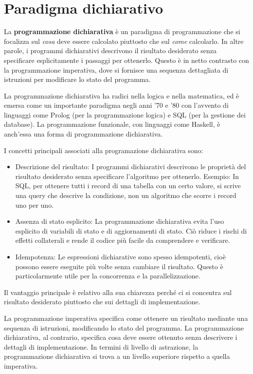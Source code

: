 \documentclass[
  letterpaper,
  DIV=11,
  numbers=noendperiod]{scrreprt}
\providecommand{\tightlist}{%
  \setlength{\itemsep}{0pt}\setlength{\parskip}{0pt}}\usepackage{longtable,booktabs,array}
\begin{document}
\section{Paradigma dichiarativo}\label{paradigma-dichiarativo}

La \textbf{programmazione dichiarativa} è un paradigma di programmazione
che si focalizza sul \emph{cosa} deve essere calcolato piuttosto che sul
\emph{come} calcolarlo. In altre parole, i programmi dichiarativi
descrivono il risultato desiderato senza specificare esplicitamente i
passaggi per ottenerlo. Questo è in netto contrasto con la
programmazione imperativa, dove si fornisce una sequenza dettagliata di
istruzioni per modificare lo stato del programma.

La programmazione dichiarativa ha radici nella logica e nella
matematica, ed è emersa come un importante paradigma negli anni '70 e
'80 con l'avvento di linguaggi come Prolog (per la programmazione
logica) e SQL (per la gestione dei database). La programmazione
funzionale, con linguaggi come Haskell, è anch'essa una forma di
programmazione dichiarativa.

I concetti principali associati alla programazione dichiarativa sono:

\begin{itemize}
\tightlist
\item
  Descrizione del risultato: I programmi dichiarativi descrivono le
  proprietà del risultato desiderato senza specificare l'algoritmo per
  ottenerlo. Esempio: In SQL, per ottenere tutti i record di una tabella
  con un certo valore, si scrive una query che descrive la condizione,
  non un algoritmo che scorre i record uno per uno.
\item
  Assenza di stato esplicito: La programmazione dichiarativa evita l'uso
  esplicito di variabili di stato e di aggiornamenti di stato. Ciò
  riduce i rischi di effetti collaterali e rende il codice più facile da
  comprendere e verificare.
\item
  Idempotenza: Le espressioni dichiarative sono spesso idempotenti, cioè
  possono essere eseguite più volte senza cambiare il risultato. Questo
  è particolarmente utile per la concorrenza e la parallelizzazione.
\end{itemize}

Il vantaggio principale è relativo alla sua chiarezza perché ci si
concentra sul risultato desiderato piuttosto che sui dettagli di
implementazione.

La programmazione imperativa specifica come ottenere un risultato
mediante una sequenza di istruzioni, modificando lo stato del programma.
La programmazione dichiarativa, al contrario, specifica cosa deve essere
ottenuto senza descrivere i dettagli di implementazione. In termini di
livello di astrazione, la programmazione dichiarativa si trova a un
livello superiore rispetto a quella imperativa.
\end{document}
